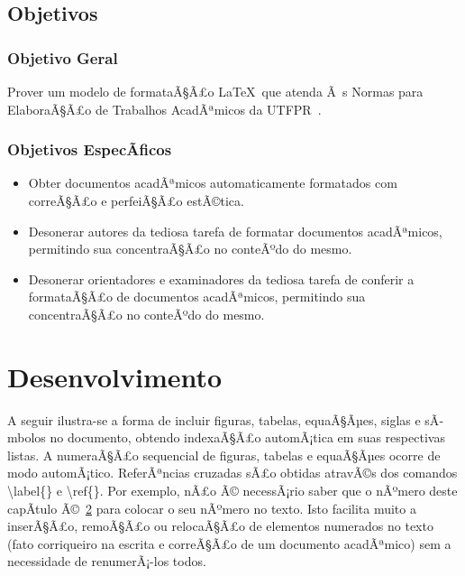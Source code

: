 \documentclass[openright]{normas-utf-tex} %
\begin{document}
\section{Objetivos}
\label{sec:objetivos}

\subsection{Objetivo Geral}
\label{subsec:objetivoGeral}

Prover um modelo de formataÃ§Ã£o \LaTeX\ que atenda Ã s Normas para ElaboraÃ§Ã£o de Trabalhos AcadÃªmicos da UTFPR~\cite{UTFPR2008}.

\subsection{Objetivos EspecÃ­ficos}
\label{subsec:objetivosEspecificos}

\begin{itemize}
	\item Obter documentos acadÃªmicos automaticamente formatados com correÃ§Ã£o e perfeiÃ§Ã£o estÃ©tica.
	\item Desonerar autores da tediosa tarefa de formatar documentos acadÃªmicos, permitindo sua concentraÃ§Ã£o no conteÃºdo do mesmo.
	\item Desonerar orientadores e examinadores da tediosa tarefa de conferir a formataÃ§Ã£o de documentos acadÃªmicos, permitindo sua concentraÃ§Ã£o no conteÃºdo do mesmo.
\end{itemize}



\chapter{Desenvolvimento}
\label{chap:desenv}

A seguir ilustra-se a forma de incluir figuras, tabelas, equaÃ§Ãµes, siglas e sÃ­mbolos no documento, obtendo indexaÃ§Ã£o automÃ¡tica em suas respectivas listas. A numeraÃ§Ã£o sequencial de figuras, tabelas e equaÃ§Ãµes ocorre de modo automÃ¡tico. ReferÃªncias cruzadas sÃ£o obtidas atravÃ©s dos comandos {\ttfamily \textbackslash label\{\}} e {\ttfamily \textbackslash ref\{\}}. Por exemplo, nÃ£o Ã© necessÃ¡rio saber que o nÃºmero deste capÃ­tulo Ã©~\ref{chap:desenv} para colocar o seu nÃºmero no texto. Isto facilita muito a inserÃ§Ã£o, remoÃ§Ã£o ou relocaÃ§Ã£o de elementos numerados no texto (fato corriqueiro na escrita e correÃ§Ã£o de um documento acadÃªmico) sem a necessidade de renumerÃ¡-los todos.
\end{document}

